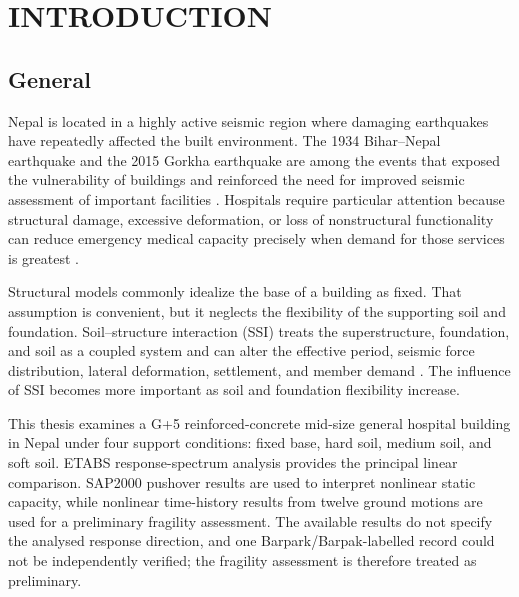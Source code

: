 \chapter{INTRODUCTION}
\section{General}
Nepal is located in a highly active seismic region where damaging earthquakes have repeatedly affected the built environment. The 1934 Bihar--Nepal earthquake and the 2015 Gorkha earthquake are among the events that exposed the vulnerability of buildings and reinforced the need for improved seismic assessment of important facilities \cite{gautam2016,adhikari2022}. Hospitals require particular attention because structural damage, excessive deformation, or loss of nonstructural functionality can reduce emergency medical capacity precisely when demand for those services is greatest \cite{guragain2004,subedi2022}.

Structural models commonly idealize the base of a building as fixed. That assumption is convenient, but it neglects the flexibility of the supporting soil and foundation. Soil--structure interaction (SSI) treats the superstructure, foundation, and soil as a coupled system and can alter the effective period, seismic force distribution, lateral deformation, settlement, and member demand \cite{wolf1985,poudel2024}. The influence of SSI becomes more important as soil and foundation flexibility increase.

This thesis examines a G+5 reinforced-concrete mid-size general hospital building in Nepal under four support conditions: fixed base, hard soil, medium soil, and soft soil. ETABS response-spectrum analysis provides the principal linear comparison. SAP2000 pushover results are used to interpret nonlinear static capacity, while nonlinear time-history results from twelve ground motions are used for a preliminary fragility assessment. The available results do not specify the analysed response direction, and one Barpark/Barpak-labelled record could not be independently verified; the fragility assessment is therefore treated as preliminary.
